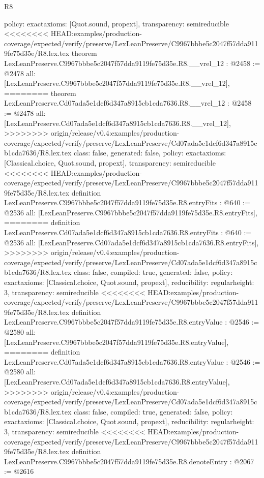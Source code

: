 \begin{lexlean}{R8}
\begin{coremodule}
{{{{{{{{{{{{{{{{{{{{{{{{{{{{{{{{{  policy: exact{axioms: [Quot.sound, propext]},
  transparency: semireducible
}
<<<<<<<< HEAD:examples/production-coverage/expected/verify/preserve/LexLeanPreserve/C9967bbbe5c2047f57dda9119fe75d35e/R8.lex.tex
theorem LexLeanPreserve.C9967bbbe5c2047f57dda9119fe75d35e.R8.__vrel_12 : @2458 := @2478 {
  all: [LexLeanPreserve.C9967bbbe5c2047f57dda9119fe75d35e.R8.__vrel_12],
========
theorem LexLeanPreserve.Cd07ada5e1dcf6d347a8915cb1cda7636.R8.__vrel_12 : @2458 := @2478 {
  all: [LexLeanPreserve.Cd07ada5e1dcf6d347a8915cb1cda7636.R8.__vrel_12],
>>>>>>>> origin/release/v0.4:examples/production-coverage/expected/verify/preserve/LexLeanPreserve/Cd07ada5e1dcf6d347a8915cb1cda7636/R8.lex.tex
  class: false,
  generated: false,
  policy: exact{axioms: [Classical.choice, Quot.sound, propext]},
  transparency: semireducible
}
<<<<<<<< HEAD:examples/production-coverage/expected/verify/preserve/LexLeanPreserve/C9967bbbe5c2047f57dda9119fe75d35e/R8.lex.tex
definition LexLeanPreserve.C9967bbbe5c2047f57dda9119fe75d35e.R8.entryFits : @640 := @2536 {
  all: [LexLeanPreserve.C9967bbbe5c2047f57dda9119fe75d35e.R8.entryFits],
========
definition LexLeanPreserve.Cd07ada5e1dcf6d347a8915cb1cda7636.R8.entryFits : @640 := @2536 {
  all: [LexLeanPreserve.Cd07ada5e1dcf6d347a8915cb1cda7636.R8.entryFits],
>>>>>>>> origin/release/v0.4:examples/production-coverage/expected/verify/preserve/LexLeanPreserve/Cd07ada5e1dcf6d347a8915cb1cda7636/R8.lex.tex
  class: false,
  compiled: true,
  generated: false,
  policy: exact{axioms: [Classical.choice, Quot.sound, propext]},
  reducibility: regular{height: 3},
  transparency: semireducible
}
<<<<<<<< HEAD:examples/production-coverage/expected/verify/preserve/LexLeanPreserve/C9967bbbe5c2047f57dda9119fe75d35e/R8.lex.tex
definition LexLeanPreserve.C9967bbbe5c2047f57dda9119fe75d35e.R8.entryValue : @2546 := @2580 {
  all: [LexLeanPreserve.C9967bbbe5c2047f57dda9119fe75d35e.R8.entryValue],
========
definition LexLeanPreserve.Cd07ada5e1dcf6d347a8915cb1cda7636.R8.entryValue : @2546 := @2580 {
  all: [LexLeanPreserve.Cd07ada5e1dcf6d347a8915cb1cda7636.R8.entryValue],
>>>>>>>> origin/release/v0.4:examples/production-coverage/expected/verify/preserve/LexLeanPreserve/Cd07ada5e1dcf6d347a8915cb1cda7636/R8.lex.tex
  class: false,
  compiled: true,
  generated: false,
  policy: exact{axioms: [Classical.choice, Quot.sound, propext]},
  reducibility: regular{height: 3},
  transparency: semireducible
}
<<<<<<<< HEAD:examples/production-coverage/expected/verify/preserve/LexLeanPreserve/C9967bbbe5c2047f57dda9119fe75d35e/R8.lex.tex
definition LexLeanPreserve.C9967bbbe5c2047f57dda9119fe75d35e.R8.denoteEntry : @2067 := @2616 {
}}}}}}}}}}}}}}}}}}}}}}}}}}}}}}}}}}}}
\end{coremodule}
\end{lexlean}
